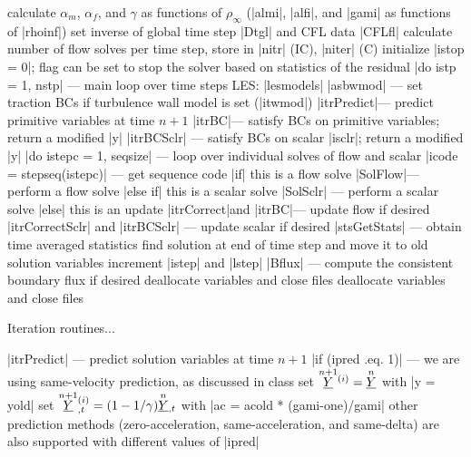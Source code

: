 \documentclass[11pt]{article}
\begin{document}
\begin{outline}[deep]
			\4 calculate $\alpha_m$, $\alpha_f$, and $\gamma$ as functions of $\rho_\infty$ (|almi|, |alfi|, and |gami| as functions of |rhoinf|)
			\4 set inverse of global time step |Dtgl| and CFL data |CFLfl|
		\3 calculate number of flow solves per time step, store in |nitr| (IC), |niter| (C)
		\3 initialize |istop = 0|; flag can be set to stop the solver based on statistics of the residual
		\3 |do istp = 1, nstp| --- main loop over time steps
			\4 LES: |lesmodels|
			\4 |asbwmod| --- set traction BCs if turbulence wall model is set (|itwmod|)
			\4 |itrPredict|\ra --- predict primitive variables at time $n+1$
			\4 |itrBC|\ra --- satisfy BCs on primitive variables; return a modified |y|
			\4 |itrBCSclr| --- satisfy BCs on scalar |isclr|; return a modified |y|
			\4 |do istepc = 1, seqsize| --- loop over individual solves of flow and scalar
				\5 |icode = stepseq(istepc)| --- get sequence code
				\5 |if| this is a flow solve
					\6 |SolFlow|\ra --- perform a flow solve
				\5 |else if| this is a scalar solve
					\6 |SolSclr| --- perform a scalar solve
				\5 |else| this is an update
					\6 |itrCorrect|\ra and |itrBC|\ra --- update flow if desired
					\6 |itrCorrectSclr| and |itrBCSclr| --- update scalar if desired
			\4 |stsGetStats| --- obtain time averaged statistics
			\4 find solution at end of time step and move it to old solution variables
			\4 increment |istep| and |lstep|
			\4 |Bflux| --- compute the consistent boundary flux if desired
		\3 deallocate variables and close files
	\2 deallocate variables and close files
\end{outline}

Iteration routines...

\begin{outline}[deep]
\1 |itrPredict| --- predict solution variables at time $n+1$
	\2 |if (ipred .eq. 1)| --- we are using same-velocity prediction, as discussed in class
		\3 set $\oset{n+1}{\ul{Y}}^{(i)} = \oset{n}{\ul{Y}}$ with |y = yold|
		\3 set $\oset{n+1}{\ul{Y}}^{(i)}_{,t} = (1-1/\gamma) \oset{n}{\ul{Y}}_{,t}$ with |ac = acold * (gami-one)/gami|
	\2 other prediction methods (zero-acceleration, same-acceleration, and same-delta) are also supported with different values of |ipred|
\end{outline}
\end{document}
